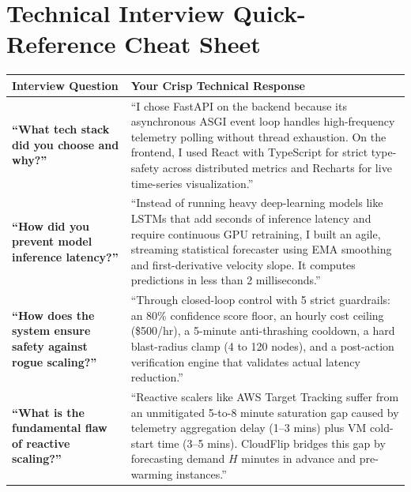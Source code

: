 \documentclass[11pt,letterpaper]{article}
\begin{document}
\section{Technical Interview Quick-Reference Cheat Sheet}

\begin{table}[h!]
\centering
\small
\renewcommand{\arraystretch}{1.3}
\begin{tabularx}{\textwidth}{p{4.2cm}X}
\toprule
\textbf{Interview Question} & \textbf{Your Crisp Technical Response} \\
\midrule
\textbf{``What tech stack did you choose and why?''} & 
``I chose FastAPI on the backend because its asynchronous ASGI event loop handles high-frequency telemetry polling without thread exhaustion. On the frontend, I used React with TypeScript for strict type-safety across distributed metrics and Recharts for live time-series visualization.'' \\

\textbf{``How did you prevent model inference latency?''} & 
``Instead of running heavy deep-learning models like LSTMs that add seconds of inference latency and require continuous GPU retraining, I built an agile, streaming statistical forecaster using EMA smoothing and first-derivative velocity slope. It computes predictions in less than 2 milliseconds.'' \\

\textbf{``How does the system ensure safety against rogue scaling?''} & 
``Through closed-loop control with 5 strict guardrails: an 80\% confidence score floor, an hourly cost ceiling (\$500/hr), a 5-minute anti-thrashing cooldown, a hard blast-radius clamp (4 to 120 nodes), and a post-action verification engine that validates actual latency reduction.'' \\

\textbf{``What is the fundamental flaw of reactive scaling?''} & 
``Reactive scalers like AWS Target Tracking suffer from an unmitigated 5-to-8 minute saturation gap caused by telemetry aggregation delay (1--3 mins) plus VM cold-start time (3--5 mins). CloudFlip bridges this gap by forecasting demand $H$ minutes in advance and pre-warming instances.'' \\
\bottomrule
\end{tabularx}
\end{table}
\end{document}

